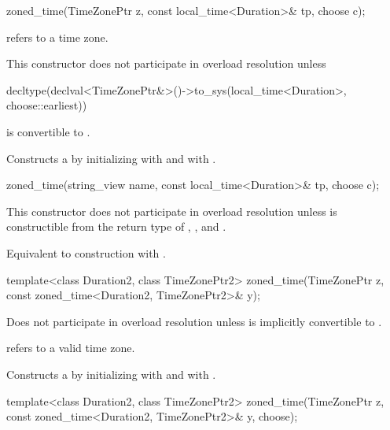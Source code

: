 \begin{itemdecl}
zoned_time(TimeZonePtr z, const local_time<Duration>& tp, choose c);
\end{itemdecl}

\begin{itemdescr}
\pnum
\requires {} refers to a time zone.

\pnum
\remarks
This constructor does not participate in overload resolution unless
\begin{codeblock}
decltype(declval<TimeZonePtr&>()->to_sys(local_time<Duration>{}, choose::earliest))
\end{codeblock}
is convertible to .

\pnum
\effects
Constructs a  by
initializing  with  and  with .
\end{itemdescr}

\begin{itemdecl}
zoned_time(string_view name, const local_time<Duration>& tp, choose c);
\end{itemdecl}

\begin{itemdescr}
\pnum
\remarks
This constructor does not participate in overload resolution unless
 is constructible from
the return type of , , and .

\pnum
\effects
Equivalent to construction with .
\end{itemdescr}

\begin{itemdecl}
template<class Duration2, class TimeZonePtr2>
  zoned_time(TimeZonePtr z, const zoned_time<Duration2, TimeZonePtr2>& y);
\end{itemdecl}

\begin{itemdescr}
\pnum
\remarks
Does not participate in overload resolution unless
 is implicitly convertible to .

\pnum
\requires {} refers to a valid time zone.

\pnum
\effects
Constructs a  by
initializing  with  and  with .
\end{itemdescr}

\begin{itemdecl}
template<class Duration2, class TimeZonePtr2>
  zoned_time(TimeZonePtr z, const zoned_time<Duration2, TimeZonePtr2>& y, choose);
\end{itemdecl}

